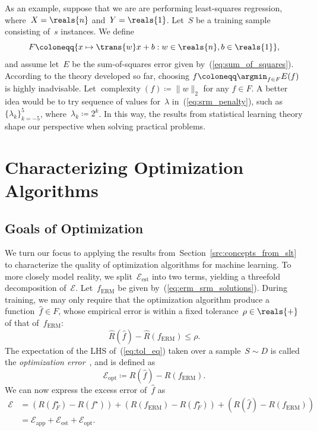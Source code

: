\documentclass[11pt,a4paper]{article}
\numberwithin{equation}{section}
\newcommand{\complexity}{\operatorname{complexity}}
\newcommand{\apperr}{\mathcal{E}_{\mathrm{app}}}
\newcommand{\esterr}{\mathcal{E}_{\mathrm{est}}}
\newcommand{\opterr}{\mathcal{E}_{\mathrm{opt}}}
\begin{document}
As an example, suppose that we are are performing least-squares regression,
where~$X = \reals{n}$ and~$Y = \reals{1}$. Let~$S$ be a training sample
consisting of~$s$ instances. We define
\begin{equation}
	F \coloneqq \{ x \mapsto \trans{w}x + b : w \in \reals{n}, b \in
		\reals{1} \},
	\label{eq:affine_family}
\end{equation}
and assume let~$E$ be the sum-of-squares error given
by~(\ref{eq:sum_of_squares}). According to the theory developed so far, choosing
$f \coloneqq \argmin_{f \in F} E(f)$ is highly inadvisable. Let $\complexity(f)
\coloneqq \|w\|_2$ for any $f \in F$. A better idea would be to try sequence of
values for~$\lambda$ in~(\ref{eq:srm_penalty}), such as~$\{ \lambda_k \}_{k =
-5}^5$, where~$\lambda_k \coloneqq 2^k$. In this way, the results from
statistical learning theory shape our perspective when solving practical
problems.

\section{Characterizing Optimization Algorithms}
\label{sec:characterizing_opt}

\subsection{Goals of Optimization}

We turn our focus to applying the results
from~Section~\ref{src:concepts_from_slt} to characterize the quality of
optimization algorithms for machine learning. To more closely model reality, we
split~$\esterr$ into two terms, yielding a threefold decomposition
of~$\mathcal{E}$. Let~$f_{\text{ERM}}$ be given by~(\ref{eq:erm_srm_solutions}).
During training, we may only require that the optimization algorithm produce a
function~$\hat{f} \in F$, whose empirical error is within a fixed
tolerance~$\rho \in \reals{+}$ of that of~$f_{\text{ERM}}$:
\begin{equation}
	\hat{R}(\hat{f}) - \hat{R}(f_{\text{ERM}}) \leq \rho.
	\label{eq:tol_eq}
\end{equation}
The expectation of the LHS of~(\ref{eq:tol_eq}) taken over a sample~$S \sim D$
is called the \emph{optimization error}~\citep{bousquet2008tradeoffs}, and is
defined as
\[
	\opterr \coloneqq R(\hat{f}) - R(f_{\text{ERM}}).
\]
We can now express the excess error of~$\hat{f}$ as
\begin{align}
	\mathcal{E}
	&= (R(f_F^\star) - R(f^\star)) + (R(f_{\text{ERM}}) - R(f_F^\star)) +
		(R(\hat{f}) - R(f_{\text{ERM}})) \\
	&= \apperr + \esterr + \opterr.
	\label{eq:excess_error}
\end{align}
\end{document}
